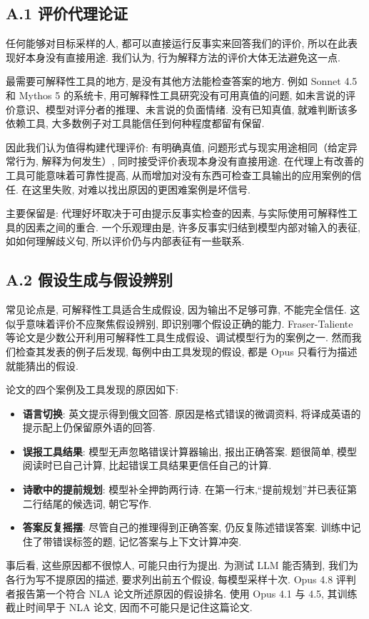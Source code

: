 \subsection*{A.1 评价代理论证}
任何能够对目标采样的人, 都可以直接运行反事实来回答我们的评价, 所以在此表现好本身没有直接用途. 我们认为, 行为解释方法的评价大体无法避免这一点.

最需要可解释性工具的地方, 是没有其他方法能检查答案的地方. 例如 Sonnet 4.5 和 Mythos 5 的系统卡, 用可解释性工具研究没有可用真值的问题, 如未言说的评价意识、模型对评分者的推理、未言说的负面情绪\cite{chive-anthropic2025sonnet45card,chive-anthropic2026mythos5card}. 没有已知真值, 就难判断该多依赖工具, 大多数例子对工具能信任到何种程度都留有保留.

因此我们认为值得构建代理评价: 有明确真值, 问题形式与现实用途相同（给定异常行为, 解释为何发生）, 同时接受评价表现本身没有直接用途. 在代理上有改善的工具可能意味着可靠性提高, 从而增加对没有东西可检查工具输出的应用案例的信任. 在这里失败, 对难以找出原因的更困难案例是坏信号.

主要保留是: 代理好坏取决于可由提示反事实检查的因素, 与实际使用可解释性工具的因素之间的重合. 一个乐观理由是, 许多反事实归结到模型内部对输入的表征, 如如何理解歧义句, 所以评价仍与内部表征有一些联系.

\subsection*{A.2 假设生成与假设辨别}
常见论点是, 可解释性工具适合生成假设\cite{chive-frasertaliente2026nla}, 因为输出不足够可靠, 不能完全信任. 这似乎意味着评价不应聚焦假设辨别, 即识别哪个假设正确的能力. Fraser-Taliente 等论文\cite{chive-frasertaliente2026nla}是少数公开利用可解释性工具生成假设、调试模型行为的案例之一. 然而我们检查其发表的例子后发现, 每例中由工具发现的假设, 都是 Opus 只看行为描述就能猜出的假设.

论文的四个案例及工具发现的原因如下:
\begin{itemize}
\item \textbf{语言切换}: 英文提示得到俄文回答. 原因是格式错误的微调资料, 将译成英语的提示配上仍保留原外语的回答.
\item \textbf{误报工具结果}: 模型无声忽略错误计算器输出, 报出正确答案. 题很简单, 模型阅读时已自己计算, 比起错误工具结果更信任自己的计算.
\item \textbf{诗歌中的提前规划}: 模型补全押韵两行诗. 在第一行末,“提前规划”并已表征第二行结尾的候选词, 朝它写作.
\item \textbf{答案反复摇摆}: 尽管自己的推理得到正确答案, 仍反复陈述错误答案. 训练中记住了带错误标签的题, 记忆答案与上下文计算冲突.
\end{itemize}
事后看, 这些原因都不很惊人, 可能只由行为提出. 为测试 LLM 能否猜到, 我们为各行为写不提原因的描述, 要求列出前五个假设, 每模型采样十次. Opus 4.8 评判者报告第一个符合 NLA 论文所述原因的假设排名. 使用 Opus 4.1 与 4.5, 其训练截止时间早于 NLA 论文, 因而不可能只是记住这篇论文.

